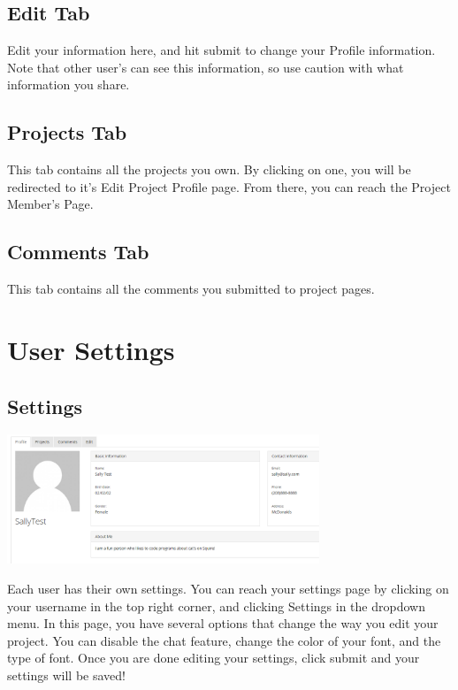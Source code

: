 \documentclass[11pt]{report}
\begin{document}
\subsection{Edit Tab}
    Edit your information here, and hit submit to change your Profile information. Note that other user's can see this information, so use caution with what information you share.

\subsection{Projects Tab}
    This tab contains all the projects you own. By clicking on one, you will be redirected to it's Edit Project Profile page. From there, you can reach the Project Member's Page.

\subsection{Comments Tab}
    This tab contains all the comments you submitted to project pages. 


\section{User Settings}
\subsection{Settings}
	\begin{center}
           \includegraphics[width=0.7\textwidth]{userguide/profile}
    \end{center}
    Each user has their own settings. You can reach your settings page by clicking on your username in the top right corner, and clicking Settings in the dropdown menu. In this page, you have several options that change the way you edit your project. You can disable the chat feature, change the color of your font, and the type of font. Once you are done editing your settings, click submit and your settings will be saved!



\end{document}
